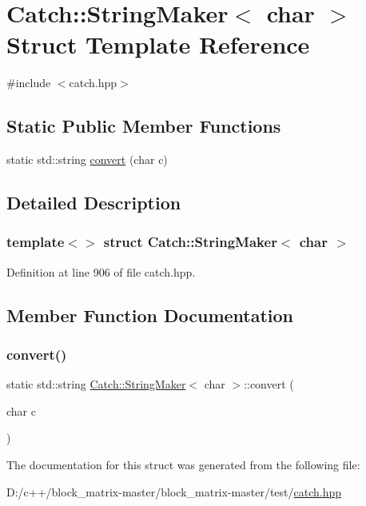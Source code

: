 \hypertarget{struct_catch_1_1_string_maker_3_01char_01_4}{}\section{Catch\+:\+:String\+Maker$<$ char $>$ Struct Template Reference}
\label{struct_catch_1_1_string_maker_3_01char_01_4}


{\ttfamily \#include $<$catch.\+hpp$>$}

\subsection*{Static Public Member Functions}
\begin{DoxyCompactItemize}
\item 
static std\+::string \mbox{\hyperlink{struct_catch_1_1_string_maker_3_01char_01_4_a4e3db69a12bb83f3ef89251893e65da5}{convert}} (char c)
\end{DoxyCompactItemize}


\subsection{Detailed Description}
\subsubsection*{template$<$$>$\newline
struct Catch\+::\+String\+Maker$<$ char $>$}



Definition at line 906 of file catch.\+hpp.



\subsection{Member Function Documentation}
\mbox{\label{struct_catch_1_1_string_maker_3_01char_01_4_a4e3db69a12bb83f3ef89251893e65da5}} 
\subsubsection{\texorpdfstring{convert()}{convert()}}
{\footnotesize\ttfamily static std\+::string \mbox{\hyperlink{struct_catch_1_1_string_maker}{Catch\+::\+String\+Maker}}$<$ char $>$\+::convert (\begin{DoxyParamCaption}\item[{char}]{c }\end{DoxyParamCaption})\hspace{0.3cm}{\ttfamily [static]}}



The documentation for this struct was generated from the following file\+:\begin{DoxyCompactItemize}
\item 
D\+:/c++/block\+\_\+matrix-\/master/block\+\_\+matrix-\/master/test/\mbox{\hyperlink{catch_8hpp}{catch.\+hpp}}\end{DoxyCompactItemize}
